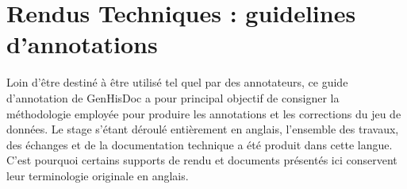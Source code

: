 \chapter[Guidelines d'Annotations]{Rendus Techniques : guidelines d'annotations}

Loin d'être destiné à être utilisé tel quel par des annotateurs, ce guide d'annotation de GenHisDoc a pour principal objectif de consigner la méthodologie employée pour produire les annotations et les corrections du jeu de données. Le stage s'étant déroulé entièrement en anglais, l'ensemble des travaux, des échanges et de la documentation technique a été produit dans cette langue. C'est pourquoi certains supports de rendu et documents présentés ici conservent leur terminologie originale en anglais.







